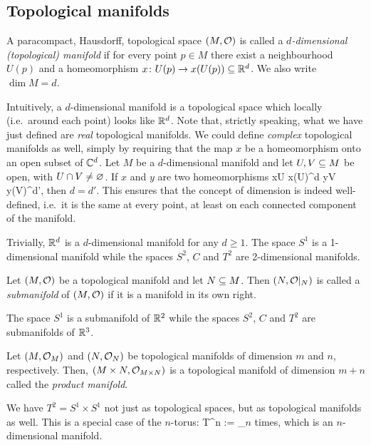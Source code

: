 \subsection{Topological manifolds}

\bd
A paracompact, Hausdorff, topological space $(M,\mathcal{O})$ is called a \emph{$d$-dimensional (topological) manifold} if for every point $p\in M$ there exist a neighbourhood $U(p)$ and a homeomorphism $x\colon U(p) \to x(U(p)) \subseteq \mathbb{R}^d$. We also write $\dim M = d$.
\ed

Intuitively, a $d$-dimensional manifold is a topological space which locally (i.e.\ around each point) looks like $\mathbb{R}^d$. Note that, strictly speaking, what we have just defined are \emph{real} topological manifolds. We could define \emph{complex} topological manifolds as well, simply by requiring that the map $x$ be a homeomorphism onto an open subset of $\mathbb{C}^d$. 
\bp
Let $M$ be a $d$-dimensional manifold and let $U,V\subseteq M$ be open, with $U\cap V \neq \varnothing$. If $x$ and $y$ are two homeomorphisms
\bse
x\cl U \to x(U)\se \R^d \qquad {}\qquad y\cl V \to y(V)\se\R^{d'},
\ese
then $d=d'$.
\ep
This ensures that the concept of dimension is indeed well-defined, i.e.\ it is the same at every point, at least on each connected component of the manifold.

\be
Trivially, $\mathbb{R}^d$ is a $d$-dimensional manifold for any $d \geq 1$. The space $S^1$ is a 1-dimensional manifold while the spaces $S^2$, $C$ and $T^2$ are 2-dimensional manifolds.
\ee

\bd
Let $(M,\mathcal{O})$ be a topological manifold and let $N \subseteq M$. Then $(N,\mathcal{O}|_N)$ is called a \emph{submanifold} of $(M,\mathcal{O})$ if it is a manifold in its own right.
\ed

\be
The space $S^1$ is a submanifold of $\mathbb{R}^2$ while the spaces $S^2$, $C$ and $T^2$ are submanifolds of $\mathbb{R}^3$. 
\ee

\bd
Let $(M,\mathcal{O}_M)$ and $(N,\mathcal{O}_N)$ be topological manifolds of dimension $m$ and $n$, respectively. Then, $(M\times N,\mathcal{O}_{M\times N})$ is a topological manifold of dimension $m+n$ called the \emph{product manifold}.
\ed

\be
We have $T^2=S^1\times S^1$ not just as topological spaces, but as topological manifolds as well. This is a special case of the $n$-torus:
\bse
T^n := _{\t{$n$ times}},
\ese
which is an $n$-dimensional manifold.
\ee

